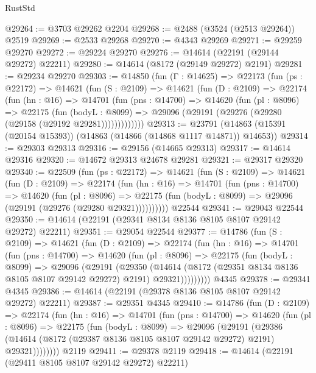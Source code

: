 \begin{lexlean}{RustStd}
\begin{coremodule}
@29264 := @3703 @29262 @2204
@29268 := @2488 (@3524 (@2513 @29264)) @2519
@29269 := @2533 @29268
@29270 := @4343 @29269
@29271 := @29259 @29270
@29272 := @29224 @29270
@29276 := @14614 (@22191 (@29144 @29272) @22211)
@29280 := @14614 (@8172 (@29149 @29272) @2191)
@29281 := @29234 @29270
@29303 := @14850
    (fun (Γ : @14625) =>
    @22173
      (fun (ps : @22172) =>
      @14621
        (fun (S : @2109) =>
        @14621
          (fun (D : @2109) =>
          @22174
            (fun (hn : @16) =>
            @14701
              (fun (pns : @14700) =>
              @14620
                (fun (pl : @8096) =>
                @22175
                  (fun (bodyL : @8099) =>
                  @29096 (@29191 (@29276 (@29280 (@29158 (@29192 @29281)))))))))))))
@29313 := @23791 (@14863 (@15391 (@20154 @15393)) (@14863 (@14866 (@14868 @1117 @14871)) @14653))
@29314 := @29303 @29313
@29316 := @29156 (@14665 @29313)
@29317 := @14614 @29316
@29320 := @14672 @29313 @24678 @29281
@29321 := @29317 @29320
@29340 := @22509
    (fun (ps : @22172) =>
    @14621
      (fun (S : @2109) =>
      @14621
        (fun (D : @2109) =>
        @22174
          (fun (hn : @16) =>
          @14701
            (fun (pns : @14700) =>
            @14620
              (fun (pl : @8096) =>
              @22175 (fun (bodyL : @8099) => @29096 (@29191 (@29276 (@29280 @29321))))))))))
    @22544
@29341 := @29043 @22544
@29350 := @14614 (@22191 (@29341 @8134 @8136 @8105 @8107 @29142 @29272) @22211)
@29351 := @29054 @22544
@29377 := @14786
    (fun (S : @2109) =>
    @14621
      (fun (D : @2109) =>
      @22174
        (fun (hn : @16) =>
        @14701
          (fun (pns : @14700) =>
          @14620
            (fun (pl : @8096) =>
            @22175
              (fun (bodyL : @8099) =>
              @29096
                (@29191
                  (@29350
                    (@14614
                      (@8172 (@29351 @8134 @8136 @8105 @8107 @29142 @29272) @2191)
                      @29321)))))))))
    @4345
@29378 := @29341 @4345
@29386 := @14614 (@22191 (@29378 @8136 @8105 @8107 @29142 @29272) @22211)
@29387 := @29351 @4345
@29410 := @14786
    (fun (D : @2109) =>
    @22174
      (fun (hn : @16) =>
      @14701
        (fun (pns : @14700) =>
        @14620
          (fun (pl : @8096) =>
          @22175
            (fun (bodyL : @8099) =>
            @29096
              (@29191
                (@29386
                  (@14614 (@8172 (@29387 @8136 @8105 @8107 @29142 @29272) @2191) @29321))))))))
    @2119
@29411 := @29378 @2119
@29418 := @14614 (@22191 (@29411 @8105 @8107 @29142 @29272) @22211)

\end{coremodule}
\end{lexlean}
